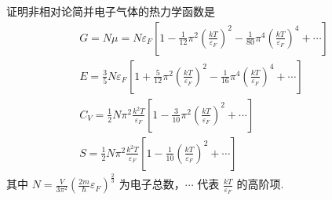 \documentclass{assignment}
\begin{document}
\begin{prob}
    证明非相对论简并电子气体的热力学函数是
    \begin{gather*}
        G=N\mu=N\varepsilon_F\left[1-\frac{1}{12}\pi^2\left(\frac{kT}{\varepsilon_F}\right)^2-\frac{1}{80}\pi^4\left(\frac{kT}{\varepsilon_F}\right)^4+\cdots\right]\\
        E=\frac{3}{5}N\varepsilon_F\left[1+\frac{5}{12}\pi^2\left(\frac{kT}{\varepsilon_F}\right)^2-\frac{1}{16}\pi^4\left(\frac{kT}{\varepsilon_F}\right)^4+\cdots\right]\\
        C_V=\frac{1}{2}N\pi^2\frac{k^2T}{\varepsilon_F}\left[1-\frac{3}{10}\pi^2\left(\frac{kT}{\varepsilon_F}\right)^2+\cdots\right]\\
        S=\frac{1}{2}N\pi^2\frac{k^2T}{\varepsilon_F}\left[1-\frac{1}{10}\left(\frac{kT}{\varepsilon_F}\right)^2+\cdots\right]
    \end{gather*}
    其中 $N=\frac{V}{3\pi^2}\left(\frac{2m}{\hbar}\varepsilon_F\right)^{\frac{2}{3}}$ 为电子总数，$\cdots$ 代表 $\frac{kT}{\varepsilon_F}$ 的高阶项.
\end{prob}
\end{document}
